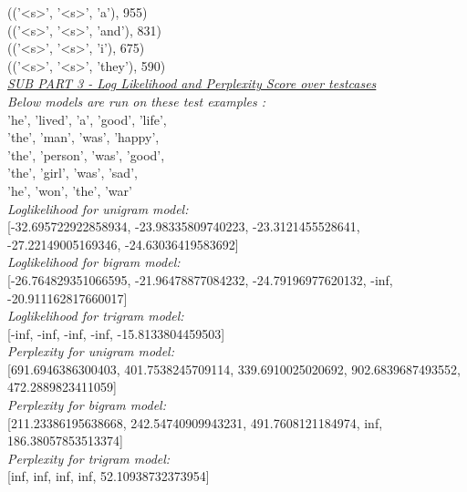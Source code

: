 \documentclass[11ppt]{article}
\begin{document}
(('\textless s\textgreater', '\textless s\textgreater', 'a'), 955) \\
(('\textless s\textgreater', '\textless s\textgreater', 'and'), 831) \\
(('\textless s\textgreater', '\textless s\textgreater', 'i'), 675) \\
(('\textless s\textgreater', '\textless s\textgreater', 'they'), 590) \\
\vspace{3mm}
\textit{\underline{SUB PART 3 - Log Likelihood and Perplexity Score over testcases}}\\
\vspace{3mm}
\textit{Below models are run on these test examples :}\\  'he', 'lived', 'a', 'good', 'life',\\ 'the', 'man', 'was', 'happy',\\ 'the', 'person', 'was', 'good',\\ 'the', 'girl', 'was', 'sad',\\ 'he', 'won', 'the', 'war'\\
\vspace{2mm}
\textit{Loglikelihood for unigram model:} \\ \vspace{1mm}  [-32.695722922858934, -23.98335809740223, -23.3121455528641, -27.22149005169346, -24.63036419583692]  \\ \vspace{2mm}
\textit{Loglikelihood for bigram model:} \\ \vspace{1mm}  [-26.764829351066595, -21.96478877084232, -24.79196977620132, -inf, -20.911162817660017]  \\ \vspace{2mm}
\textit{Loglikelihood for trigram model:} \\ \vspace{1mm}  [-inf, -inf, -inf, -inf, -15.8133804459503]  \\ \vspace{2mm}
\textit{Perplexity for unigram model:} \\ \vspace{1mm}  [691.6946386300403, 401.7538245709114, 339.6910025020692, 902.6839687493552, 472.2889823411059]  \\ \vspace{2mm}
\textit{Perplexity for bigram model:} \\ \vspace{1mm}  [211.23386195638668, 242.54740909943231, 491.7608121184974, inf, 186.38057853513374]  \\ \vspace{2mm}
\textit{Perplexity for trigram model:} \\ \vspace{1mm}  [inf, inf, inf, inf, 52.10938732373954]  \\ 
\vspace{4mm}
\end{document}
